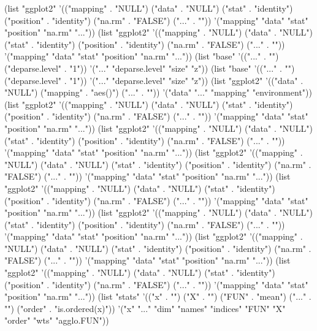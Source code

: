 (list "ggplot2" '(("mapping" . "NULL") ("data" . "NULL") ("stat" . "identity") ("position" . "identity") ("na.rm" . "FALSE") ("..." . "")) '("mapping" "data" "stat" "position" "na.rm" "..."))
(list "ggplot2" '(("mapping" . "NULL") ("data" . "NULL") ("stat" . "identity") ("position" . "identity") ("na.rm" . "FALSE") ("..." . "")) '("mapping" "data" "stat" "position" "na.rm" "..."))
(list "base" '(("..." . "") ("deparse.level" . "1")) '("..." "deparse.level" "size" "z"))
(list "base" '(("..." . "") ("deparse.level" . "1")) '("..." "deparse.level" "size" "z"))
(list "ggplot2" '(("data" . "NULL") ("mapping" . "aes()") ("..." . "")) '("data" "..." "mapping" "environment"))
(list "ggplot2" '(("mapping" . "NULL") ("data" . "NULL") ("stat" . "identity") ("position" . "identity") ("na.rm" . "FALSE") ("..." . "")) '("mapping" "data" "stat" "position" "na.rm" "..."))
(list "ggplot2" '(("mapping" . "NULL") ("data" . "NULL") ("stat" . "identity") ("position" . "identity") ("na.rm" . "FALSE") ("..." . "")) '("mapping" "data" "stat" "position" "na.rm" "..."))
(list "ggplot2" '(("mapping" . "NULL") ("data" . "NULL") ("stat" . "identity") ("position" . "identity") ("na.rm" . "FALSE") ("..." . "")) '("mapping" "data" "stat" "position" "na.rm" "..."))
(list "ggplot2" '(("mapping" . "NULL") ("data" . "NULL") ("stat" . "identity") ("position" . "identity") ("na.rm" . "FALSE") ("..." . "")) '("mapping" "data" "stat" "position" "na.rm" "..."))
(list "ggplot2" '(("mapping" . "NULL") ("data" . "NULL") ("stat" . "identity") ("position" . "identity") ("na.rm" . "FALSE") ("..." . "")) '("mapping" "data" "stat" "position" "na.rm" "..."))
(list "ggplot2" '(("mapping" . "NULL") ("data" . "NULL") ("stat" . "identity") ("position" . "identity") ("na.rm" . "FALSE") ("..." . "")) '("mapping" "data" "stat" "position" "na.rm" "..."))
(list "ggplot2" '(("mapping" . "NULL") ("data" . "NULL") ("stat" . "identity") ("position" . "identity") ("na.rm" . "FALSE") ("..." . "")) '("mapping" "data" "stat" "position" "na.rm" "..."))
(list "stats" '(("x" . "") ("X" . "") ("FUN" . "mean") ("..." . "") ("order" . "is.ordered(x)")) '("x" "..." "dim" "names" "indices" "FUN" "X" "order" "wts" "agglo.FUN"))
